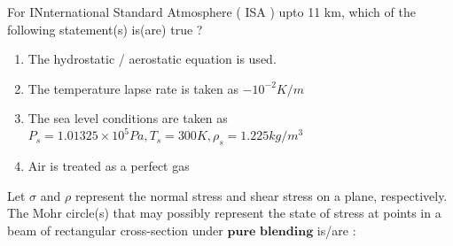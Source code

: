 \iffalse
\title{GATE Questions 19}
\author{EE24BTECH11012 - Bhavanisankar G S}
\section{ae}
\chapter{2022}
\fi
	\item For INnternational Standard Atmosphere ( ISA ) upto 11 km, which of the following statement(s) is(are) true ?
		\begin{enumerate}
			\item The hydrostatic / aerostatic equation is used.
			\item The temperature lapse rate is taken as $-10^{-2} K/m$
			\item The sea level conditions are taken as $P_s = 1.01325 \times 10^5 Pa, T_s = 300 K, \rho_s = 1.225 kg/m^3$
			\item Air is treated as a perfect gas
		\end{enumerate}
	\item Let $\sigma$ and $\rho$ represent the normal stress and shear stress on a plane, respectively. The Mohr circle(s) that may possibly represent the state of stress at points in a beam of rectangular cross-section under $\textbf{pure blending}$ is/are :

